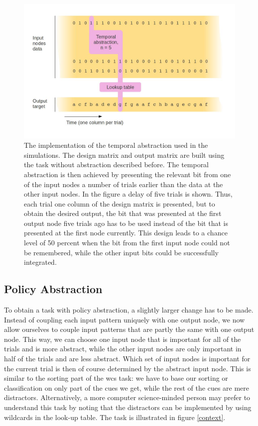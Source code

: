 \documentclass[10pt,a4paper]{report}
\begin{document}
\begin{figure}[bthp]
\includegraphics[width=\textwidth]{figures/tasktemp.jpg}
\caption{The implementation of the temporal abstraction used in the simulations. The design matrix and output matrix are built using the task without abstraction described before. The temporal abstraction is then achieved by presenting the relevant bit from one of the input nodes a number of trials earlier than the data at the other input nodes. In the figure a delay of five trials is shown. Thus, each trial one column of the design matrix is presented, but to obtain the desired output, the bit that was presented at the first output node five trials ago has to be used instead of the bit that is presented at the first node currently. This design leads to a chance level of 50 percent when the bit from the first input node could not be remembered, while the other input bits could be successfully integrated.}
\label{temporal}
\end{figure}

\subsection*{Policy Abstraction}


To obtain a task with policy abstraction, a slightly larger change has to be made. Instead of coupling each input pattern uniquely with one output node, we now allow ourselves to couple input patterns that are partly the same with one output node. This way, we can choose one input node that is important for all of the trials and is more abstract, while the other input nodes are only important in half of the trials and are less abstract. Which set of input nodes is important for the current trial is then of course determined by the abstract input node. This is similar to the sorting part of the \gls{wcs} task: we have to base our sorting or classification on only part of the cues we get, while the rest of the cues are mere distractors. Alternatively, a more computer science-minded person may prefer to understand this task by noting that the distractors can be implemented by using wildcards in the look-up table. The task is illustrated in figure \ref{context}.
\end{document}
